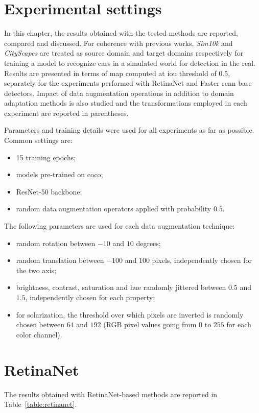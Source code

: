 \documentclass[%
    corpo=12pt,
    twoside,
    stile=classica,   
    tipotesi=magistrale,
    evenboxes,
    english,
	numerazioneromana,
]{toptesi}
\begin{document}
\section{Experimental settings}
In this chapter, the results obtained with the tested methods are reported, compared and discussed. For coherence with previous works, \textit{Sim10k} and \textit{CityScapes} are treated as source domain and target domains respectively for training a model to recognize cars in a simulated world for detection in the real. Results are presented in terms of \gls{map} computed at \gls{iou} threshold of $ 0.5 $, separately for the experiments performed with RetinaNet and Faster \gls{rcnn} base detectors. Impact of data augmentation operations in addition to domain adaptation methods is also studied and the transformations employed in each experiment are reported in parentheses.

Parameters and training details were used for all experiments as far as possible. Common settings are:
\begin{itemize}
	\item 15 training epochs;
	\item models pre-trained on \gls{coco};
	\item ResNet-50 backbone;
	\item random data augmentation operators applied with probability $ 0.5 $.
\end{itemize}
The following parameters are used for each data augmentation technique:
\begin{itemize}
	\item random rotation between $ -10 $ and $ 10 $ degrees;
	\item random translation between $ -100 $ and $ 100 $ pixels, independently chosen for the two axis;
	\item brightness, contrast, saturation and hue randomly jittered between $ 0.5 $ and $ 1.5 $, independently chosen for each property;
	\item for solarization, the threshold over which pixels are inverted is randomly chosen between $ 64 $ and $ 192 $ (RGB pixel values going from $ 0 $ to $ 255 $ for each color channel).
\end{itemize}

\section{RetinaNet}
The results obtained with RetinaNet-based methods are reported in Table~\ref{table:retinanet}.
\end{document}
